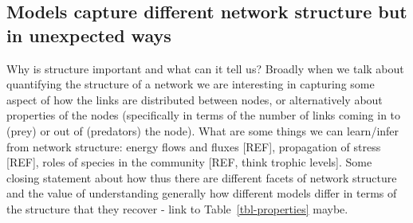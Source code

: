 \documentclass[
]{article}
\begin{document}
\subsection{Models capture different network structure but in unexpected
ways}\label{models-capture-different-network-structure-but-in-unexpected-ways}

Why is structure important and what can it tell us? Broadly when we talk
about quantifying the structure of a network we are interesting in
capturing some aspect of how the links are distributed between nodes, or
alternatively about properties of the nodes (specifically in terms of
the number of links coming in to (prey) or out of (predators) the node).
What are some things we can learn/infer from network structure: energy
flows and fluxes {[}REF{]}, propagation of stress {[}REF{]}, roles of
species in the community {[}REF, think trophic levels{]}. Some closing
statement about how thus there are different facets of network structure
and the value of understanding generally how different models differ in
terms of the structure that they recover - link to
Table~\ref{tbl-properties} maybe.
\end{document}
